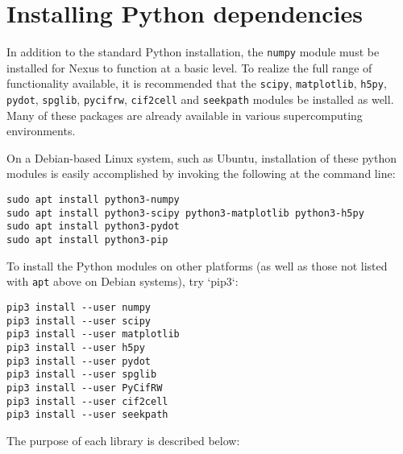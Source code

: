 \documentclass[oneside,11pt]{memoir}
\numberwithin{equation}{section}
\begin{document}
\section{Installing Python dependencies}
In addition to the standard Python installation, the \texttt{numpy} module must 
be installed for Nexus to function at a basic level.  To realize 
the full range of functionality available, it is recommended that the 
\texttt{scipy}, \texttt{matplotlib}, \texttt{h5py}, \texttt{pydot}, 
\texttt{spglib}, \texttt{pycifrw}, \texttt{cif2cell} and \texttt{seekpath} 
modules be installed as well.  Many of these packages are already available 
in various supercomputing environments.  

On a Debian-based Linux system, such as Ubuntu, installation of 
these python modules is easily accomplished by invoking the following at the 
command line:
\begin{shaded}
\begin{verbatim}
sudo apt install python3-numpy
sudo apt install python3-scipy python3-matplotlib python3-h5py 
sudo apt install python3-pydot
sudo apt install python3-pip
\end{verbatim}
\end{shaded}
\noindent

To install the Python modules on other platforms (as well as those not listed with \texttt{apt} above on Debian systems), try `pip3`:
\begin{shaded}
\begin{verbatim}
pip3 install --user numpy
pip3 install --user scipy
pip3 install --user matplotlib
pip3 install --user h5py
pip3 install --user pydot
pip3 install --user spglib
pip3 install --user PyCifRW
pip3 install --user cif2cell
pip3 install --user seekpath
\end{verbatim}
\end{shaded}

The purpose of each library is described below:
\end{document}
